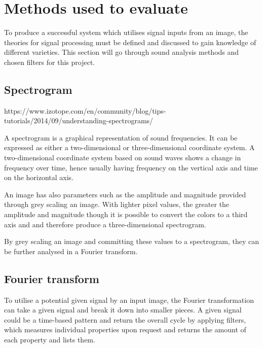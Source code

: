\section{Methods used to evaluate}\label{sec:methodsusedtoevaluate}

To produce a successful system which utilises signal inputs from an image, the theories for signal processing must be defined and discussed to gain knowledge of different varieties. This section will go through sound analysis methods and chosen filters for this project. 

\subsection{Spectrogram}\label{sub:spectrogram}

https://www.izotope.com/en/community/blog/tips-tutorials/2014/09/understanding-spectrograms/

 A spectrogram is a graphical representation of sound frequencies. It can be expressed as either a two-dimensional or three-dimensional coordinate system. A two-dimensional coordinate system based on sound waves shows a change in frequency over time, hence usually having frequency on the vertical axis and time on the horizontal axis. 

An image has also parameters such as the  amplitude and magnitude provided through grey scaling an image.  With lighter pixel values, the greater the amplitude and magnitude though it is possible to convert the colors to a third axis and and therefore produce a three-dimensional spectrogram.

By grey scaling an image and committing these values to a spectrogram, they can be further analysed in a Fourier transform.  

\subsection{Fourier transform}\label{sub:fourier}

To utilise a potential given signal by an input image, the Fourier transformation can take a given signal and  break it down into smaller pieces. A given signal could be a time-based pattern and return the  overall cycle by applying filters, which measures individual properties upon request and returns the amount of each property and lists them. 

